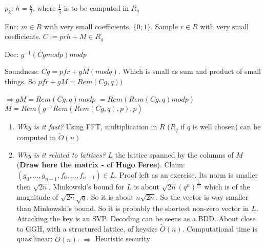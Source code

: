 \documentclass[a4paper,10pt]{article}
\begin{document}
$p_k$: $h=\frac{g}{f}$, where $\frac{1}{g}$ is to be computed in $R_q$

Enc: $m \in R$ with very small coefficients, $\{0;1\}$. Sample $r \in R$ with very small coefficients. $C := p r h +M \in R_q$

Dec: $g^{-1} (C g mod p) mod p$

Soundness: $C g= p f r + g M (mod q)$. Which is small as sum and product of small things.
So $p f r+g M= Rem(C g,q))$

$\Rightarrow g M = Rem (C g, q) mod p$
$= Rem (Rem(C g,q) mod p)$
$M = Rem(g^{-1} Rem(Rem (C g, q),p),p)$

\begin{enumerate}
\item \textit{Why is it fast?}
Using FFT, multiplication in $R$ ($R_q$ if $q$ is well chosen) can be computed in $\tilde{O}(n)$
\item \textit{Why is it related to lattices?} $L$ the lattice spanned by the columns of $M$ (\textbf{Draw here the matrix - cf Hugo Feree}). Claim: $(g_0,...,g_{n-1},f_0,...,f_{n-1}) \in L$. Proof left as an exercise. Its norm is smaller then $\sqrt{2 n}$. Minkowski's bound for $L$ is about $\sqrt{2 n} (q^n)^{\frac{1}{2 n}}$ which is of the magnitude of $\sqrt{2 n} \sqrt{q}$. So it is about $n \sqrt{2 n}$. So the vector is way smaller than Minkowski's bound. So it is probably the shortest non-zero vector in $L$. Attacking the key is an SVP. Decoding can be seens as a BDD. About close to GGH, with a structured lattice, of keysize $\tilde{O}(n)$. Computational time is quasilinear: $\tilde{O}(n)$. $\Rightarrow$ Heuristic security
\end{enumerate}



\end{document}
